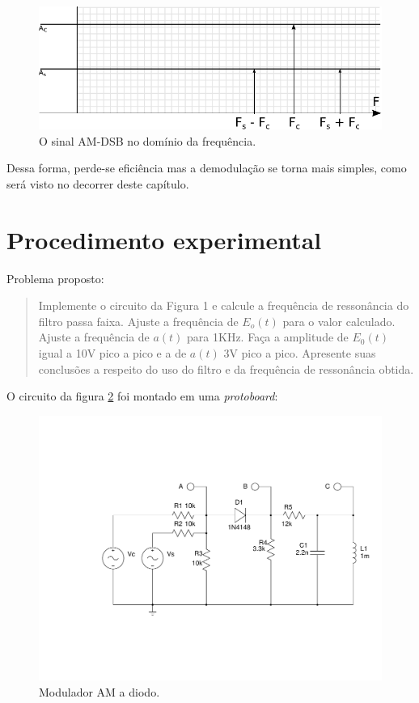 \documentclass[]{report}
\begin{document}
\begin{figure}[H]
\begin{center}
\includegraphics[scale=0.8,clip]{./imagens/frequencia_AM_DSB}
\end{center}
\caption{O sinal AM-DSB no domínio da frequência.}
\label{fig:am_dsb_frequencia}
\end{figure}

Dessa forma, perde-se eficiência mas a demodulação se torna mais simples, como será visto no decorrer deste capítulo.

\section{Procedimento experimental}

Problema proposto:
\begin{quote}
Implemente o circuito da Figura 1 e calcule a frequência de ressonância do filtro passa faixa. Ajuste a frequência de $E_o(t)$ para o valor calculado. Ajuste a frequência de $a(t)$ para 1KHz. Faça a amplitude de $E_0(t)$ igual a 10V pico a pico e a de $a(t)$ 3V pico a pico. Apresente suas conclusões a respeito do uso do filtro e da frequência de ressonância obtida.
\end{quote}


O circuito da figura \ref{fig:demodulador_AM_diodo} foi montado em uma \textit{protoboard}:
\begin{figure}[H]
\begin{center}
\includegraphics[scale=0.4,clip]{./imagens/AM_Modulator_Diode}
\end{center}
\caption{Modulador AM a diodo.}
\label{fig:demodulador_AM_diodo}
\end{figure}
\end{document}
